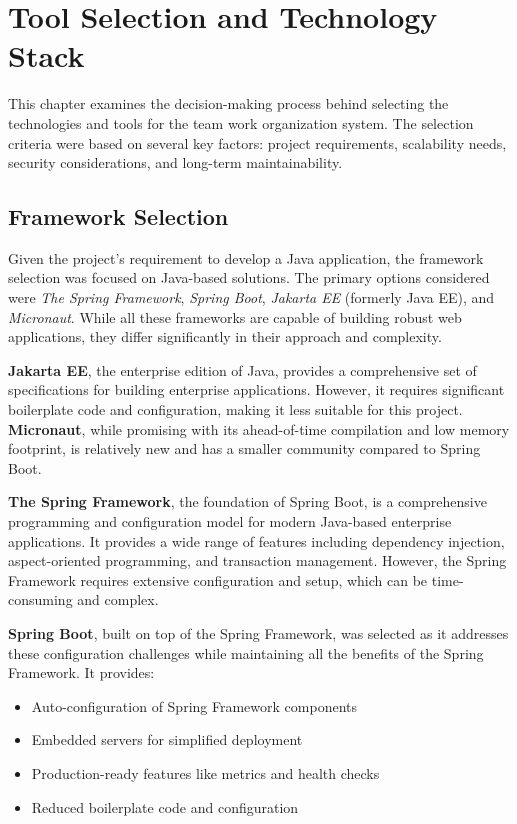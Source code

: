 \section{Tool Selection and Technology Stack}\label{sec:tools}

This chapter examines the decision-making process behind selecting the technologies and tools for the team work organization system.
The selection criteria were based on several key factors: project requirements, scalability needs, security considerations, and long-term maintainability.

\subsection{Framework Selection}\label{subsec:framework-selection}

Given the project's requirement to develop a Java application, the framework selection was focused on Java-based solutions.
The primary options considered were \textit{The Spring Framework}, \textit{Spring Boot},  \textit{Jakarta EE} (formerly Java EE), and \textit{Micronaut}.
While all these frameworks are capable of building robust web applications, they differ significantly in their approach and complexity.

\textbf{Jakarta EE}, the enterprise edition of Java, provides a comprehensive set of specifications for building enterprise applications.
However, it requires significant boilerplate code and configuration, making it less suitable for this project.
\textbf{Micronaut}, while promising with its ahead-of-time compilation and low memory footprint, is relatively new and has a smaller community compared to Spring Boot.

\textbf{The Spring Framework}, the foundation of Spring Boot, is a comprehensive programming and configuration model for modern Java-based enterprise applications.
It provides a wide range of features including dependency injection, aspect-oriented programming, and transaction management.
However, the Spring Framework requires extensive configuration and setup, which can be time-consuming and complex.

\textbf{Spring Boot}, built on top of the Spring Framework, was selected as it addresses these configuration challenges while maintaining all the benefits of the Spring Framework.
It provides:
\begin{itemize}
    \item Auto-configuration of Spring Framework components
    \item Embedded servers for simplified deployment
    \item Production-ready features like metrics and health checks
    \item Reduced boilerplate code and configuration
\end{itemize}

